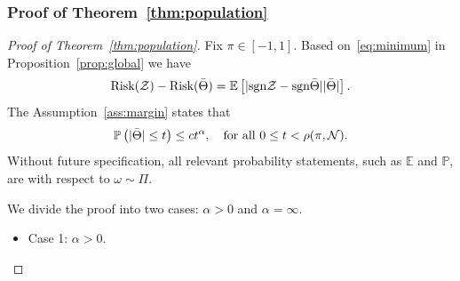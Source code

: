 \documentclass[11pt]{article}
\theoremstyle{plain}
\theoremstyle{definition}
\def\sign{\textup{sgn}}
\def\risk{\textup{Risk}}
\begin{document}
\subsubsection{Proof of Theorem~\ref{thm:population}}
\begin{proof}[Proof of Theorem~\ref{thm:population}]
Fix $\pi\in[-1,1]$. Based on~\eqref{eq:minimum} in Proposition~\ref{prop:global} we have
\begin{equation}\label{eq:population2}
\risk(\tZ)- \risk(\bar \Theta) = \mathbb{E}\left[|\sign \tZ-\sign\bar \Theta||\bar \Theta|\right].
\end{equation}
The Assumption~\ref{ass:margin} states that
\begin{equation}\label{eq:ass}
\mathbb{P}\left(|\bar \Theta | \leq t\right)\leq ct^\alpha,\quad \text{for all } 0\leq t< \rho(\pi,\mathcal{N}).
\end{equation}
Without future specification, all relevant probability statements, such as $\mathbb{E}$ and $\mathbb{P}$, are with respect to $\omega\sim \Pi$. 

We divide the proof into two cases: $\alpha >0$ and $\alpha = \infty$.
\begin{itemize}[leftmargin=*,topsep=0pt,itemsep=-1ex,partopsep=1ex,parsep=1ex]
\item Case 1: $\alpha>0$. 


\end{itemize}
\end{proof}
\end{document}
